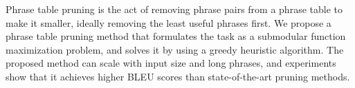 Phrase table pruning is the act of removing phrase pairs from a phrase table to make it smaller, ideally removing the least useful phrases first. We propose a phrase table pruning method that formulates the task as a submodular function maximization problem, and solves it by using a greedy heuristic algorithm. The proposed method can scale with input size              and long phrases, and experiments show that it achieves higher BLEU scores than state-of-the-art pruning methods.
